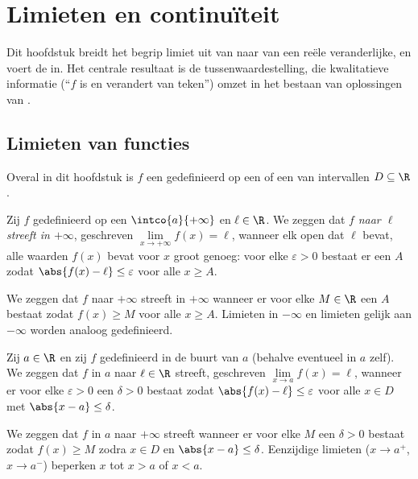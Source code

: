 \chapter{Limieten en continuïteit}\label{ch:g12:limcont}

Dit hoofdstuk breidt het begrip limiet uit van  naar  van een
reële veranderlijke, en voert de  in. Het centrale resultaat is de
tussenwaardestelling, die kwalitatieve informatie (``$f$ is  en
verandert van teken'') omzet in het bestaan van oplossingen van
.

\section{Limieten van functies}

Overal in dit hoofdstuk is $f$ een  gedefinieerd op een  of een
 van intervallen $D \subseteq \R$.

\begin{definition}\label{def:g12:limcont:liminf}
Zij $f$ gedefinieerd op een  $\intco{a}{+\infty}$ en $\ell \in \R$.
We zeggen dat $f$ \emph{naar $\ell$ streeft in $+\infty$}, geschreven $\lim\limits_{x\to+\infty} f(x) = \ell$, wanneer elk
open  dat $\ell$ bevat, alle waarden $f(x)$ bevat voor $x$ groot
genoeg: voor elke $\varepsilon > 0$ bestaat er een $A$ zodat
$\abs{f(x) - \ell} \leq \varepsilon$ voor alle $x \geq A$.

We zeggen dat $f$ naar $+\infty$ streeft in $+\infty$ wanneer er voor elke
$M \in \R$ een $A$ bestaat zodat $f(x) \geq M$ voor alle $x \geq A$. Limieten
in $-\infty$ en limieten gelijk aan $-\infty$ worden analoog gedefinieerd.
\end{definition}

\begin{definition}\label{def:g12:limcont:limpoint}
Zij $a \in \R$ en zij $f$ gedefinieerd in de buurt van $a$ (behalve
eventueel in $a$ zelf). We zeggen dat $f$ in $a$ naar $\ell \in \R$ streeft,
geschreven $\lim\limits_{x \to a} f(x) = \ell$, wanneer er voor elke
$\varepsilon > 0$ een $\delta > 0$ bestaat zodat
$\abs{f(x) - \ell} \leq \varepsilon$ voor alle $x \in D$ met
$\abs{x - a} \leq \delta$.

We zeggen dat $f$ in $a$ naar $+\infty$ streeft wanneer er voor elke $M$ een
$\delta > 0$ bestaat zodat $f(x) \geq M$ zodra $x \in D$ en
$\abs{x - a} \leq \delta$. Eenzijdige limieten ($x \to a^+$, $x \to a^-$)
beperken $x$ tot $x > a$ of $x < a$.
\end{definition}


